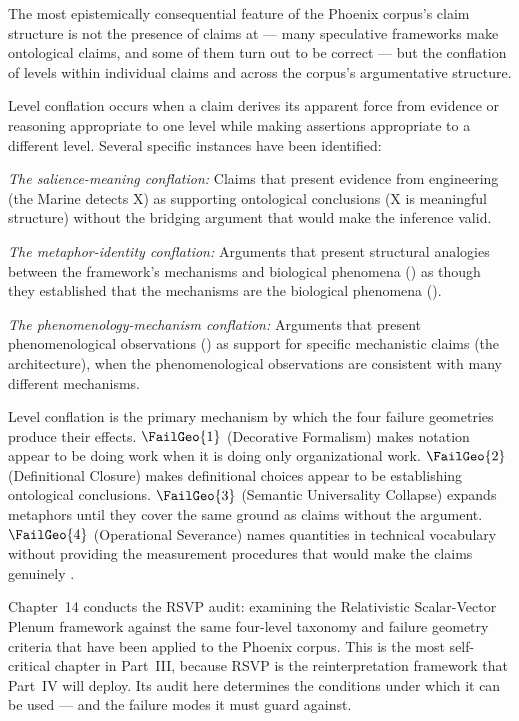 The most epistemically consequential feature of the
Phoenix corpus's claim structure is not the presence
of claims at \LevelIV{} --- many speculative frameworks
make ontological claims, and some of them turn out to
be correct --- but the conflation of levels within
individual claims and across the corpus's argumentative
structure.

Level conflation occurs when a claim derives its apparent
force from evidence or reasoning appropriate to one
level while making assertions appropriate to a different
level. Several specific instances have been identified:

\textit{The salience-meaning conflation:} Claims that
present evidence from engineering (the Marine detects
X) as supporting ontological conclusions (X is meaningful
structure) without the bridging argument that
would make the inference valid.

\textit{The metaphor-identity conflation:} Arguments
that present structural analogies between the framework's
mechanisms and biological phenomena (\LevelII{}) as
though they established that the mechanisms are the
biological phenomena (\LevelIV{}).

\textit{The phenomenology-mechanism conflation:} Arguments
that present phenomenological observations (\LevelIII{})
as support for specific mechanistic claims (the \MEMeight{}
architecture), when the phenomenological observations
are consistent with many different mechanisms.

Level conflation is the primary mechanism by which the
four failure geometries produce their effects. $\FailGeo{1}$
(Decorative Formalism) makes \LevelI{} notation appear
to be doing \LevelI{} work when it is doing only
organizational work. $\FailGeo{2}$ (Definitional Closure)
makes \LevelII{} definitional choices appear to be
establishing \LevelIV{} ontological conclusions.
$\FailGeo{3}$ (Semantic Universality Collapse) expands
\LevelII{} metaphors until they cover the same ground
as \LevelIV{} claims without the argument. $\FailGeo{4}$
(Operational Severance) names \LevelIV{} quantities
in \LevelI{} technical vocabulary without providing
the measurement procedures that would make the claims
genuinely \LevelI{}.

\medskip

Chapter~14 conducts the RSVP audit: examining the
Relativistic Scalar-Vector Plenum framework against
the same four-level taxonomy and failure geometry
criteria that have been applied to the Phoenix corpus.
This is the most self-critical chapter in Part~III,
because RSVP is the reinterpretation framework that
Part~IV will deploy. Its audit here determines the
conditions under which it can be used --- and the
failure modes it must guard against.
